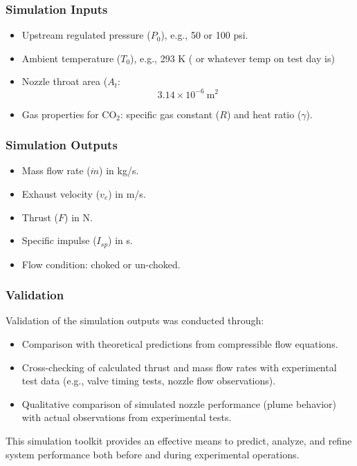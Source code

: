 \documentclass{new-aiaa}
\begin{document}
\subsubsection{Simulation Inputs}
\begin{itemize}
    \item Upstream regulated pressure ($P_0$), e.g., 50 or 100 psi.
    \item Ambient temperature ($T_0$), e.g., 293 K ( or whatever temp on test day is)
    \item Nozzle throat area ($A_t$:\[ 3.14 \times 10^{-6} \ \text{m}^2\]
    \item Gas properties for CO$_2$: specific gas constant ($R$) and heat ratio ($\gamma$).
\end{itemize}

\subsubsection{Simulation Outputs}
\begin{itemize}
    \item Mass flow rate ($\dot{m}$) in kg/s.
    \item Exhaust velocity ($v_e$) in m/s.
    \item Thrust ($F$) in N.
    \item Specific impulse ($I_{sp}$) in s.
    \item Flow condition: choked or un-choked.
\end{itemize}

\subsubsection{Validation}
Validation of the simulation outputs was conducted through:
\begin{itemize}
    \item Comparison with theoretical predictions from compressible flow equations.
    \item Cross-checking of calculated thrust and mass flow rates with experimental test data (e.g., valve timing tests, nozzle flow observations).
    \item Qualitative comparison of simulated nozzle performance (plume behavior) with actual observations from experimental tests.
\end{itemize}

This simulation toolkit provides an effective means to predict, analyze, and refine system performance both before and during experimental operations.
\end{document}
